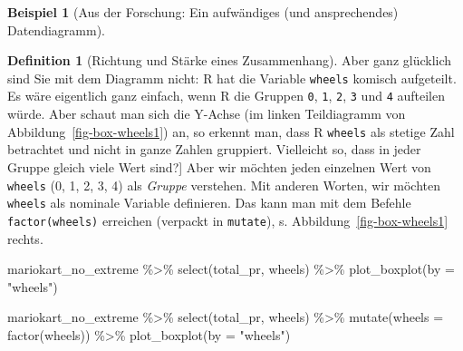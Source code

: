 \documentclass[
  a4paper,
]{scrbook}
\newenvironment{Shaded}{\begin{snugshade}}{\end{snugshade}}
\newcommand{\AttributeTok}[1]{\textcolor[rgb]{0.40,0.45,0.13}{#1}}
\newcommand{\FunctionTok}[1]{\textcolor[rgb]{0.28,0.35,0.67}{#1}}
\newcommand{\NormalTok}[1]{\textcolor[rgb]{0.00,0.23,0.31}{#1}}
\newcommand{\SpecialCharTok}[1]{\textcolor[rgb]{0.37,0.37,0.37}{#1}}
\newcommand{\StringTok}[1]{\textcolor[rgb]{0.13,0.47,0.30}{#1}}
\theoremstyle{definition}
\newtheorem{example}{Beispiel}[chapter]
\theoremstyle{definition}
\newtheorem{definition}{Definition}[chapter]
\theoremstyle{definition}
\theoremstyle{remark}
\begin{document}
\begin{example}[Aus der Forschung: Ein aufwändiges (und ansprechendes)
Datendiagramm]
\begin{definition}[Richtung und Stärke eines
Zusammenhang]
Aber ganz glücklich sind Sie mit dem Diagramm nicht: R hat die Variable
\texttt{wheels} komisch aufgeteilt. Es wäre eigentlich ganz einfach,
wenn R die Gruppen \texttt{0}, \texttt{1}, \texttt{2}, \texttt{3} und
\texttt{4} aufteilen würde. Aber schaut man sich die Y-Achse (im linken
Teildiagramm von Abbildung~\ref{fig-box-wheels1}) an, so erkennt man,
dass R \texttt{wheels} als stetige Zahl betrachtet und nicht in ganze
Zahlen gruppiert. Vielleicht so, dass in jeder Gruppe gleich viele Wert
sind?{]} Aber wir möchten jeden einzelnen Wert von \texttt{wheels} (0,
1, 2, 3, 4) als \emph{Gruppe} verstehen. Mit anderen Worten, wir möchten
\texttt{wheels} als nominale Variable definieren. Das kann man mit dem
Befehle \texttt{factor(wheels)} erreichen (verpackt in \texttt{mutate}),
s. Abbildung~\ref{fig-box-wheels1} rechts.

\begin{Shaded}
\begin{Highlighting}[]

\NormalTok{mariokart\_no\_extreme }\SpecialCharTok{\%\textgreater{}\%} 
  \FunctionTok{select}\NormalTok{(total\_pr, wheels) }\SpecialCharTok{\%\textgreater{}\%} 
  \FunctionTok{plot\_boxplot}\NormalTok{(}\AttributeTok{by =} \StringTok{"wheels"}\NormalTok{)}

\NormalTok{mariokart\_no\_extreme }\SpecialCharTok{\%\textgreater{}\%} 
  \FunctionTok{select}\NormalTok{(total\_pr, wheels) }\SpecialCharTok{\%\textgreater{}\%} 
  \FunctionTok{mutate}\NormalTok{(}\AttributeTok{wheels =} \FunctionTok{factor}\NormalTok{(wheels)) }\SpecialCharTok{\%\textgreater{}\%} 
  \FunctionTok{plot\_boxplot}\NormalTok{(}\AttributeTok{by =} \StringTok{"wheels"}\NormalTok{)}
\end{Highlighting}
\end{Shaded}

\begin{figure}

\begin{minipage}{0.50\linewidth}

\end{minipage}
\end{figure}
\end{definition}
\end{example}
\end{document}
